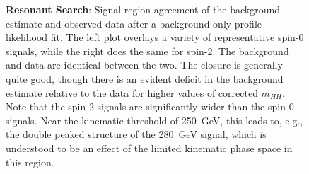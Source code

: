 \begin{figure}[ht]
  \centering
  \caption{\label{fig:res-sr-mhh} \textbf{Resonant Search}: Signal region agreement of the background estimate and 
  observed data after a background-only profile likelihood fit. The left plot overlays a variety of representative 
  spin-0 signals, while the right does the same for spin-2. The background and data are identical between the two. 
  The closure is generally quite good, though there is an evident deficit in the background estimate relative to the 
  data for higher values of corrected $m_{HH}$. Note that the spin-2 signals are significantly wider than the spin-0 
  signals. Near the kinematic threshold of \SI{250}{\GeV}, this leads to, e.g., the double peaked structure of the 
  \SI{280}{\GeV} signal, which is understood to be an effect of the limited kinematic phase space in this region.}
\end{figure}

